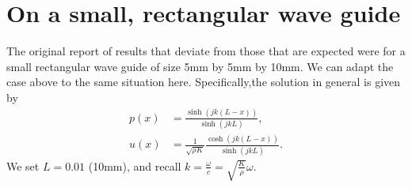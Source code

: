 \documentclass{article}
\begin{document}
\section{On a small, rectangular wave guide}

The original report of results that deviate from those that are
expected were for a small rectangular wave guide of size 5mm by 5mm by
10mm. We can adapt the case above to the same situation
here. Specifically,the solution in general is given by
\begin{align*}
  p(x)
  &=
  \frac{\sinh(jk(L-x))}{\sinh(jkL)},
  \\
  u(x)
  &=
  \frac{1}{\sqrt{\rho K}}
  \frac{\cosh(jk(L-x))}{\sinh(jkL)}.
\end{align*}
We set $L=0.01$ (10mm), and recall $k=\frac{\omega}{c}=\sqrt{\frac{K}{\rho}}\omega$.
\end{document}
